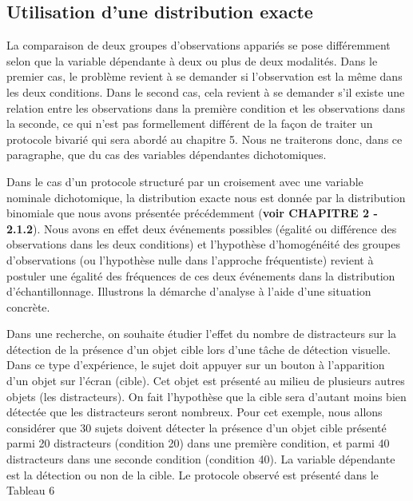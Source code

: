\documentclass[]{book}
\theoremstyle{definition}
\theoremstyle{definition}
\theoremstyle{definition}
\theoremstyle{remark}
\begin{document}
\hypertarget{utilisation-dune-distribution-exacte-2}{%
\subsection{Utilisation d'une distribution
exacte}\label{utilisation-dune-distribution-exacte-2}}

La comparaison de deux groupes d'observations appariés se pose
différemment selon que la variable dépendante à deux ou plus de deux
modalités. Dans le premier cas, le problème revient à se demander si
l'observation est la même dans les deux conditions. Dans le second cas,
cela revient à se demander s'il existe une relation entre les
observations dans la première condition et les observations dans la
seconde, ce qui n'est pas formellement différent de la façon de traiter
un protocole bivarié qui sera abordé au chapitre 5. Nous ne traiterons
donc, dans ce paragraphe, que du cas des variables dépendantes
dichotomiques.

Dans le cas d'un protocole structuré par un croisement avec une variable
nominale dichotomique, la distribution exacte nous est donnée par la
distribution binomiale que nous avons présentée précédemment
(\textbf{voir CHAPITRE 2 - 2.1.2}). Nous avons en effet deux événements
possibles (égalité ou différence des observations dans les deux
conditions) et l'hypothèse d'homogénéité des groupes d'observations (ou
l'hypothèse nulle dans l'approche fréquentiste) revient à postuler une
égalité des fréquences de ces deux événements dans la distribution
d'échantillonnage. Illustrons la démarche d'analyse à l'aide d'une
situation concrète.

Dans une recherche, on souhaite étudier l'effet du nombre de
distracteurs sur la détection de la présence d'un objet cible lors d'une
tâche de détection visuelle. Dans ce type d'expérience, le sujet doit
appuyer sur un bouton à l'apparition d'un objet sur l'écran (cible). Cet
objet est présenté au milieu de plusieurs autres objets (les
distracteurs). On fait l'hypothèse que la cible sera d'autant moins bien
détectée que les distracteurs seront nombreux. Pour cet exemple, nous
allons considérer que 30 sujets doivent détecter la présence d'un objet
cible présenté parmi 20 distracteurs (condition 20) dans une première
condition, et parmi 40 distracteurs dans une seconde condition
(condition 40). La variable dépendante est la détection ou non de la
cible. Le protocole observé est présenté dans le Tableau 6
\end{document}

